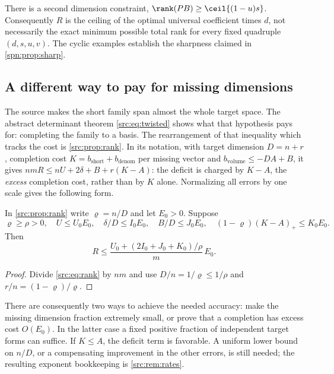 There is a second dimension constraint, $\rank(PB)\ge\ceil{(1-u)s}$.
Consequently $R$ is the ceiling of the optimal universal coefficient times
$d$, not necessarily the exact minimum possible total rank for every fixed
quadruple $(d,s,u,v)$. The cyclic examples establish the sharpness claimed in
\cref{spn:prop:sharp}.

\subsection{A different way to pay for missing dimensions}\label{spn:sec:missing}

The source makes the short family span almost the whole target space. The
abstract determinant theorem \eqref{src:eq:twisted} shows what that
hypothesis pays for: completing the family to a basis. The rearrangement of
that inequality which tracks the cost is \cref{src:prop:rank}. In its
notation, with target dimension $D=n+r$, completion cost
$K=b_{\mathrm{short}}+b_{\mathrm{denom}}$ per missing vector and
$b_{\mathrm{volume}}\le-DA+B$, it gives
$nmR\le nU+2\delta+B+r(K-A)$: the deficit is charged by $K-A$, the
\emph{excess} completion cost, rather than by $K$ alone. Normalizing all
errors by one scale gives the following form.

\begin{corollary}\label{spn:cor:rank-error}
In \cref{src:prop:rank} write $\varrho=n/D$ and let $E_0>0$. Suppose
\[
 \varrho\ge\rho>0,\quad U\le U_0E_0,\quad \delta/D\le I_0E_0,\quad
 B/D\le J_0E_0,\quad(1-\varrho)(K-A)_+\le K_0E_0 .
\]
Then
\begin{equation}\label{spn:eq:rank-error}
 R\le\frac{U_0+(2I_0+J_0+K_0)/\rho}{m}\,E_0 .
\end{equation}
\end{corollary}

\begin{proof}
Divide \eqref{src:eq:rank} by $nm$ and use $D/n=1/\varrho\le1/\rho$ and
$r/n=(1-\varrho)/\varrho$.
\end{proof}

There are consequently two ways to achieve the needed accuracy: make the
missing dimension fraction extremely small, or prove that a completion has
excess cost $O(E_0)$. In the latter case a fixed positive fraction of
independent target forms can suffice. If $K\le A$, the deficit term is
favorable. A uniform lower bound on $n/D$, or a compensating improvement in
the other errors, is still needed; the resulting exponent bookkeeping is
\cref{src:rem:rates}.

